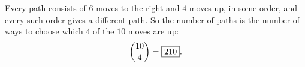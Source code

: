 Every path consists of $6$ moves to the right and $4$ moves up, in some order, and every such order gives a different path. So the number of paths is the number of ways to choose which $4$ of the $10$ moves are up:
\[\dbinom{10}{4}=\boxed{210}.\]

